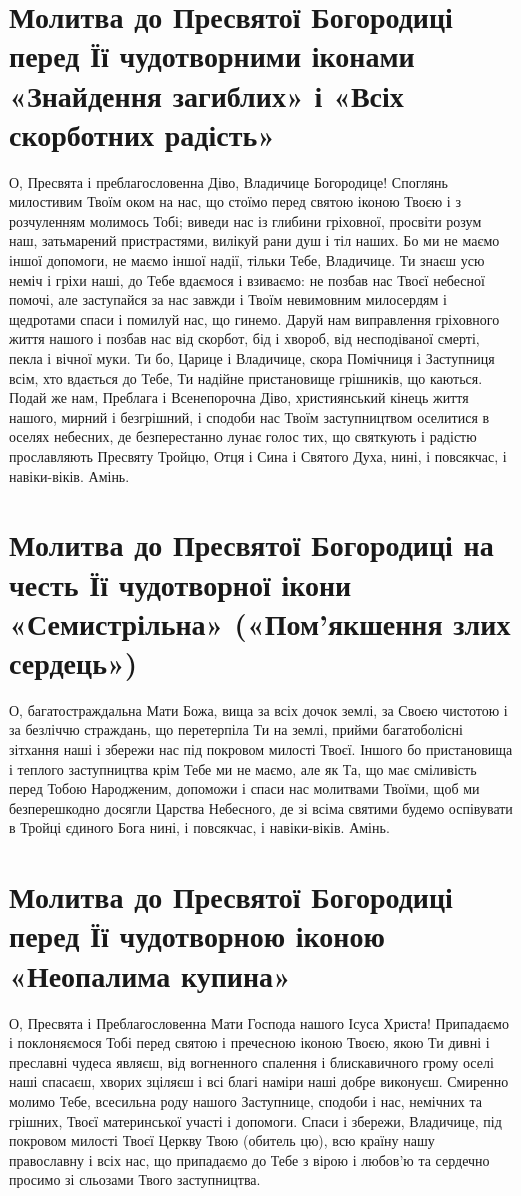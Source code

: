 \documentclass[chapters.tex]{subfiles}
\begin{document}
\section{Молитва до Пресвятої Богородиці перед Її чудотворними іконами «Знайдення загиблих» і «Всіх скорботних радість»}
О, Пресвята і преблагословенна Діво, Владичице Богородице! Споглянь милостивим Твоїм оком на нас, що стоїмо перед святою іконою Твоєю і з розчуленням молимось Тобі; виведи нас із глибини гріховної, просвіти розум наш, затьмарений пристрастями, вилікуй рани душ і тіл наших. Бо ми не маємо іншої допомоги, не маємо іншої надії, тільки Тебе, Владичице. Ти знаєш усю неміч і гріхи наші, до Тебе вдаємося і взиваємо: не позбав нас Твоєї небесної помочі, але заступайся за нас завжди і Твоїм невимовним милосердям і щедротами спаси і помилуй нас, що гинемо. Даруй нам виправлення гріховного життя нашого і позбав нас від скорбот, бід і хвороб, від несподіваної смерті, пекла і вічної муки. Ти бо, Царице і Владичице, скора Помічниця і Заступниця всім, хто вдається до Тебе, Ти надійне пристановище грішників, що каються. Подай же нам, Преблага і Всенепорочна Діво, християнський кінець життя нашого, мирний і безгрішний, і сподоби нас Твоїм заступництвом оселитися в оселях небесних, де безперестанно лунає голос тих, що святкують і радістю прославляють Пресвяту Тройцю, Отця і Сина і Святого Духа, нині, і повсякчас, і навіки-віків. Амінь.

\section{Молитва до Пресвятої Богородиці на честь Її чудотворної ікони «Семистрільна» («Пом’якшення злих сердець»)}
О, багатостраждальна Мати Божа, вища за всіх дочок землі, за Своєю чистотою і за безліччю страждань, що перетерпіла Ти на землі, прийми багатоболісні зітхання наші і збережи нас під покровом милості Твоєї. Іншого бо пристановища і теплого заступництва крім Тебе ми не маємо, але як Та, що має сміливість перед Тобою Народженим, допоможи і спаси нас молитвами Твоїми, щоб ми безперешкодно досягли Царства Небесного, де зі всіма святими будемо оспівувати в Тройці єдиного Бога нині, і повсякчас, і навіки-віків. Амінь.

\section{Молитва до Пресвятої Богородиці перед Її чудотворною іконою «Неопалима купина»}
О, Пресвята і Преблагословенна Мати Господа нашого Ісуса Христа! Припадаємо і поклоняємося Тобі перед святою і пречесною іконою Твоєю, якою Ти дивні і преславні чудеса являєш, від вогненного спалення і блискавичного грому оселі наші спасаєш, хворих зціляєш і всі благі наміри наші добре виконуєш. Смиренно молимо Тебе, всесильна роду нашого Заступнице, сподоби і нас, немічних та грішних, Твоєї материнської участі і допомоги. Спаси і збережи, Владичице, під покровом милості Твоєї Церкву Твою (обитель цю), всю країну нашу православну і всіх нас, що припадаємо до Тебе з вірою і любов’ю та сердечно просимо зі сльозами Твого заступництва.
\end{document}

